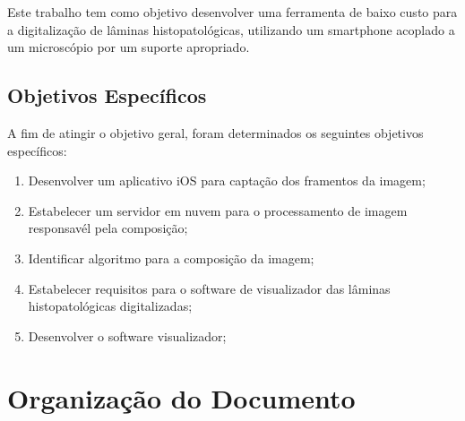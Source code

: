 Este trabalho tem como objetivo desenvolver uma ferramenta de baixo custo para a digitalização de lâminas histopatológicas, utilizando um smartphone acoplado a um microscópio por um suporte apropriado.

\subsection{Objetivos Específicos}
A fim de atingir o objetivo geral, foram determinados os seguintes objetivos específicos:

\begin{enumerate}
    \item Desenvolver um aplicativo iOS para captação dos framentos da imagem;
    \item Estabelecer um servidor em nuvem para o processamento de imagem responsavél pela composição;
    \item Identificar algoritmo para a composição da imagem;
    \item Estabelecer requisitos para o software de visualizador das lâminas histopatológicas digitalizadas;
    \item Desenvolver o software visualizador;
\end{enumerate}

\section{Organização do Documento}





